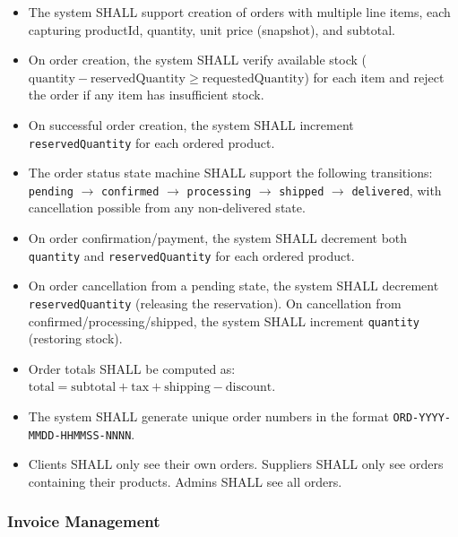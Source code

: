 \documentclass[12pt,onecolumn]{IEEEtran}
\begin{document}
\begin{tcolorbox}[reqbox,title={FR-ORD: Order Requirements}]
\begin{itemize}[leftmargin=1.5em]
  \item {} The system SHALL support creation of orders with multiple line items, each capturing productId, quantity, unit price (snapshot), and subtotal.
  \item {} On order creation, the system SHALL verify available stock ($\text{quantity} - \text{reservedQuantity} \geq \text{requestedQuantity}$) for each item and reject the order if any item has insufficient stock.
  \item {} On successful order creation, the system SHALL increment \texttt{reservedQuantity} for each ordered product.
  \item {} The order status state machine SHALL support the following transitions: \texttt{pending} $\to$ \texttt{confirmed} $\to$ \texttt{processing} $\to$ \texttt{shipped} $\to$ \texttt{delivered}, with cancellation possible from any non-delivered state.
  \item {} On order confirmation/payment, the system SHALL decrement both \texttt{quantity} and \texttt{reservedQuantity} for each ordered product.
  \item {} On order cancellation from a pending state, the system SHALL decrement \texttt{reservedQuantity} (releasing the reservation). On cancellation from confirmed/processing/shipped, the system SHALL increment \texttt{quantity} (restoring stock).
  \item {} Order totals SHALL be computed as: $\text{total} = \text{subtotal} + \text{tax} + \text{shipping} - \text{discount}$.
  \item {} The system SHALL generate unique order numbers in the format \texttt{ORD-YYYY-MMDD-HHMMSS-NNNN}.
  \item {} Clients SHALL only see their own orders. Suppliers SHALL only see orders containing their products. Admins SHALL see all orders.
\end{itemize}
\end{tcolorbox}

\subsubsection{Invoice Management}
\end{document}
